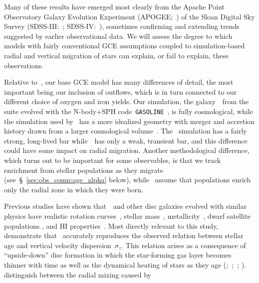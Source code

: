 \documentclass[draft2.tex]{subfiles}
\begin{document}
Many of these results have emerged most clearly from the Apache Point 
Observatory Galaxy Evolution Experiment (APOGEE;~\citealp{Majewski2017}) of 
the Sloan Digital Sky Survey (SDSS-III:~\citealp{Eisenstein2011}; 
SDSS-IV:~\citealp{Blanton2017}), sometimes confirming and extending trends 
suggested by earlier observational data. We will assess the degree to which 
models with fairly conventional GCE assumptions coupled to simulation-based 
radial and vertical migration of stars can explain, or fail to explain, these 
observations. 
\par 
Relative to~\citet{Minchev2013, Minchev2014}, our base GCE model has many 
differences of detail, the most important being our inclusion of outflows, 
which is in turn connected to our different choice of oxygen and iron yields. 
Our simulation, the galaxy~\hsim~from the~\citet{Christensen2012} 
suite evolved with the N-body+SPH code~\texttt{GASOLINE}~\citep{Wadsley2004}, 
is fully cosmological, while the simulation used by~\citet{Minchev2013, 
Minchev2014} has a more idealized geometry with merger and accretion history 
drawn from a larger cosmological volume~\citep{Martig2012}. 
The~\citet{Minchev2013, Minchev2014} simulation has a fairly strong, 
long-lived bar while~\hsim~has only a weak, transient bar, and this difference 
could have some impact on radial migration. 
Another methodological difference, which turns out to be important for some 
observables, is that we track enrichment from stellar populations as they 
migrate (see~\S~\ref{sec:obs_comp:age_alpha} below), while~\citet{Minchev2013, 
Minchev2014} assume that populations enrich only the radial zone in which they 
were born. 
\par 
Previous studies have shown that~\hsim~and other disc galaxies evolved with 
similar physics have realistic rotation curves~\citep{Governato2012, 
Christensen2014a, Christensen2014b}, stellar mass~\citep{Munshi2013}, 
metallicity~\citep{Christensen2016}, dwarf satellite populations 
\citep{Zolotov2012, Brooks2014}, and HI properties~\citep{Brooks2017}. 
Most directly relevant to this study,~\citet{Bird2021} demonstrate that 
\hsim~accurately reproduces the observed relation between stellar age and 
vertical velocity dispersion~$\sigma_z$. 
This relation arises as a consequence of ``upside-down'' disc formation in 
which the star-forming gas layer becomes thinner with time as well as the 
dynamical heating of stars as they age (\citealp*{Bournaud2009a, 
Bournaud2009b, Forbes2012};~\citealp{Bird2013};~\citealp*{Vincenzo2019}; 
\citealp{Yu2021}). 
\citet{Schoenrich2009a} distinguish between the radial mixing caused by 
\end{document}
